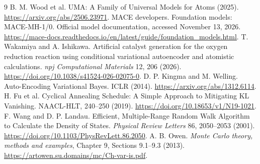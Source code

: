 \begin{thebibliography}{9}
 B. M. Wood et al.
UMA: A Family of Universal Models for Atoms (2025).
\url{https://arxiv.org/abs/2506.23971}.
 MACE developers.
Foundation models: MACE-MH-1/0. Official model documentation,
accessed November 13, 2026.
\url{https://mace-docs.readthedocs.io/en/latest/guide/foundation_models.html}.
 T. Wakamiya and A. Ishikawa.
Artificial catalyst generation for the oxygen reduction reaction using
conditional variational autoencoder and atomistic calculations.
\emph{npj Computational Materials} 12, 206 (2026).
\url{https://doi.org/10.1038/s41524-026-02075-0}.
 D. P. Kingma and M. Welling.
Auto-Encoding Variational Bayes. ICLR (2014).
\url{https://arxiv.org/abs/1312.6114}.
 H. Fu et al.
Cyclical Annealing Schedule: A Simple Approach to Mitigating KL Vanishing.
NAACL-HLT, 240--250 (2019).
\url{https://doi.org/10.18653/v1/N19-1021}.
 F. Wang and D. P. Landau.
Efficient, Multiple-Range Random Walk Algorithm to Calculate the Density of
States. \emph{Physical Review Letters} 86, 2050--2053 (2001).
\url{https://doi.org/10.1103/PhysRevLett.86.2050}.
 A. B. Owen.
\emph{Monte Carlo theory, methods and examples}, Chapter 9,
Sections 9.1--9.3 (2013).
\url{https://artowen.su.domains/mc/Ch-var-is.pdf}.
\end{thebibliography}
